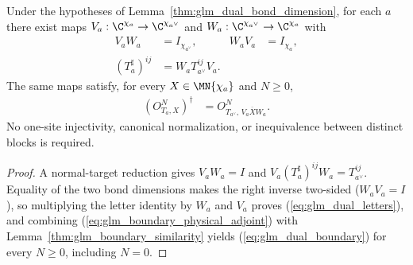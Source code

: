 \begin{lemma}
    \label{thm:glm_normal_adjoint_gauge}
    \leanok
    Under the hypotheses of Lemma~\ref{thm:glm_dual_bond_dimension},
    for each $a$ there exist maps
    $V_a:\C^{\chi_a}\to\C^{\chi_{a^\vee}}$ and
    $W_a:\C^{\chi_{a^\vee}}\to\C^{\chi_a}$ with
    \begin{align}
        V_aW_a            & =I_{\chi_{a^\vee}},     & W_aV_a & =I_{\chi_a},
        \label{eq:glm_dual_inverses}                                        \\
        (T_a^\sharp)^{ij} & =W_aT_{a^\vee}^{ij}V_a.
        \label{eq:glm_dual_letters}
    \end{align}
    The same maps satisfy, for every $X\in\MN{\chi_a}$ and $N\geq0$,
    \begin{align}
        (O^N_{T_a,X})^\dagger
         & =O^N_{T_{a^\vee},\,V_a\overline XW_a}.
        \label{eq:glm_dual_boundary}
    \end{align}
    No one-site injectivity, canonical normalization, or inequivalence
    between distinct blocks is required.
\end{lemma}
\begin{proof}\leanok
    A normal-target reduction gives $V_aW_a=I$ and
    $V_a(T_a^\sharp)^{ij}W_a=T_{a^\vee}^{ij}$.
    Equality of the two bond dimensions makes the right inverse two-sided
    ($W_aV_a=I$), so multiplying the letter identity by $W_a$ and $V_a$
    proves (\ref{eq:glm_dual_letters}), and combining
    (\ref{eq:glm_boundary_physical_adjoint}) with
    Lemma~\ref{thm:glm_boundary_similarity} yields
    (\ref{eq:glm_dual_boundary}) for every $N\geq0$, including $N=0$.
\end{proof}

